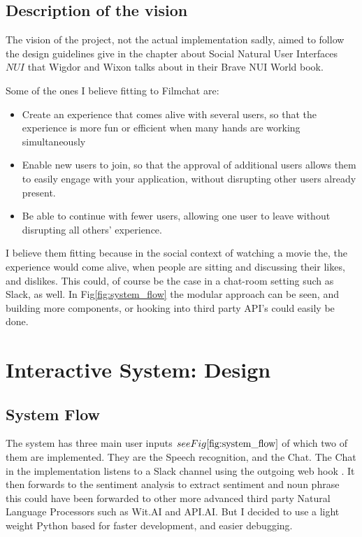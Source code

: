 \documentclass[11pt,fleqn]{book} %
\begin{document}
\section{Description of the vision}
The vision of the project, not the actual implementation sadly, aimed to follow the design guidelines give in the chapter about Social Natural User Interfaces \(NUI\) that Wigdor and Wixon talks about in their Brave NUI World book. \cite{WigdorBraveWorld}

Some of the ones I believe fitting to Filmchat are:
\begin{itemize}
\item Create an experience that comes alive with several users, so that the experience
is more fun or efficient when many hands are working simultaneously
\item Enable new users to join, so that the approval of additional users allows them
to easily engage with your application, without disrupting other users already
present.
\item Be able to continue with fewer users, allowing one user to leave without disrupting all others’ experience.
\end{itemize}
I believe them fitting because in the social context of watching a movie the, the experience would come alive, when people are sitting and discussing their likes, and dislikes.
This could, of course be the case in a chat-room setting such as Slack, as well. In Fig\ref{fig:system_flow} the modular approach can be seen, and building more components, or hooking into third party API's could easily be done. 

\chapter{Interactive System: Design}
\section{System Flow}
The system has three main user inputs \(see Fig\ref{fig:system_flow}\) of which two of them are implemented. They are the Speech recognition, and the Chat. The Chat in the implementation listens to a Slack channel using the outgoing web hook \cite{SlackOutgoingSlack}. It then forwards to the sentiment analysis to extract sentiment and noun phrase \cite{WikipediaNounPhrase} this could have been forwarded to other more advanced third party Natural Language Processors\cite{Wikipedia2017NaturalProcessing} such as Wit.AI\cite{Wit.aiWit.ai} and API.AI\cite{API.AIConversationalAPI.AI}. But I decided to use a light weight Python based for faster development, and easier debugging.
\end{document}

